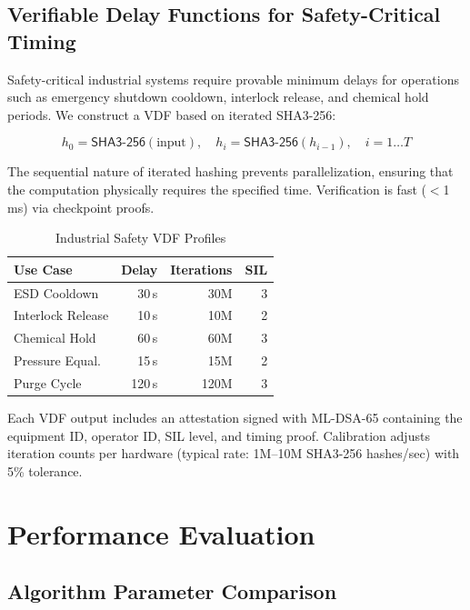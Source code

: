 \documentclass[conference,10pt]{IEEEtran}
\newcommand{\mldsa}{\textsf{ML-DSA}}
\newcommand{\shaiii}{\textsf{SHA3-256}}
\begin{document}
\subsection{Verifiable Delay Functions for Safety-Critical Timing}

Safety-critical industrial systems require provable minimum delays for operations such as emergency shutdown cooldown, interlock release, and chemical hold periods. We construct a VDF based on iterated \shaiii{}:

\begin{equation}
    h_0 = \shaiii{}(\text{input}), \quad h_i = \shaiii{}(h_{i-1}), \quad i = 1 \ldots T
\end{equation}

The sequential nature of iterated hashing prevents parallelization, ensuring that the computation physically requires the specified time. Verification is fast ($<$1\,ms) via checkpoint proofs.

\begin{table}[t]
\centering
\caption{Industrial Safety VDF Profiles}
\label{tab:vdf}
\begin{tabular}{lrrr}
\toprule
\textbf{Use Case} & \textbf{Delay} & \textbf{Iterations} & \textbf{SIL} \\
\midrule
ESD Cooldown & 30\,s & 30M & 3 \\
Interlock Release & 10\,s & 10M & 2 \\
Chemical Hold & 60\,s & 60M & 3 \\
Pressure Equal. & 15\,s & 15M & 2 \\
Purge Cycle & 120\,s & 120M & 3 \\
\bottomrule
\end{tabular}
\end{table}

Each VDF output includes an attestation signed with \mldsa{}-65 containing the equipment ID, operator ID, SIL level, and timing proof. Calibration adjusts iteration counts per hardware (typical rate: 1M--10M SHA3-256 hashes/sec) with 5\% tolerance.

\section{Performance Evaluation}
\label{sec:performance}

\subsection{Algorithm Parameter Comparison}
\end{document}
